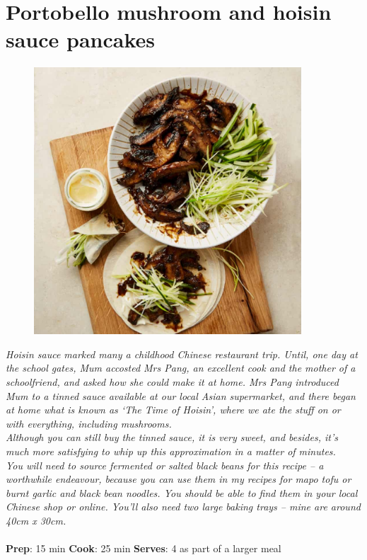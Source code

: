 \documentclass{book}
\begin{document}
\section{Portobello mushroom and hoisin sauce pancakes}
\begin{figure}
\centering\includegraphics[width=10cm,height=10cm,keepaspectratio]{Recipe_Pictures/Portobello_mushroom_and_hoisin_sauce_pancakes.png}
\end{figure}
\emph{Hoisin sauce marked many a childhood Chinese restaurant trip. Until, one day at the school gates, Mum accosted Mrs Pang, an excellent cook and the mother of a schoolfriend, and asked how she could make it at home. Mrs Pang introduced Mum to a tinned sauce available at our local Asian supermarket, and there began at home what is known as ‘The Time of Hoisin’, where we ate the stuff on or with everything, including mushrooms.\\ 
Although you can still buy the tinned sauce, it is very sweet, and besides, it’s much more satisfying to whip up this approximation in a matter of minutes.\\ 
You will need to source fermented or salted black beans for this recipe – a worthwhile endeavour, because you can use them in my recipes for mapo tofu or burnt garlic and black bean noodles. You should be able to find them in your local Chinese shop or online. You’ll also need two large baking trays – mine are around 40cm x 30cm.}\\\\ 
\textbf{Prep}: 15 min
\textbf{Cook}: 25 min
\textbf{Serves}: 4 as part of a larger meal
\end{document}
